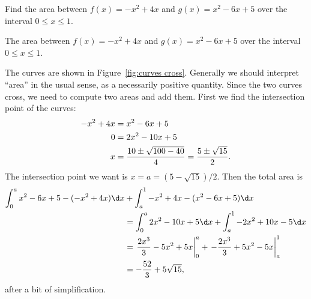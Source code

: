 \begin{example} Find the area between $f(x)= -x^2+4x$ and
$g(x)=x^2-6x+5$ over the interval $0\le x\le 1$.
\end{example}

\begin{marginfigure}
\caption{The area between $f(x)= -x^2+4x$ and
$g(x)=x^2-6x+5$ over the interval $0\le x\le 1$.}
\label{fig:curves cross}
\end{marginfigure}


\begin{solution}
The curves are shown in Figure~\ref{fig:curves cross}. Generally we
should interpret ``area'' in the usual sense, as a necessarily
positive quantity. Since the two curves cross, we need to compute two
areas and add them. First we find the intersection point of the
curves:
\begin{align*}
  -x^2+4x&=x^2-6x+5 \\
  0&=2x^2-10x+5 \\
  x&={10\pm\sqrt{100-40}\over4}={5\pm\sqrt{15}\over2}.
\end{align*}
The intersection point we want is $x=a=(5-\sqrt{15})/2$. Then
the total area is 
\begin{align*}
  \int_0^a x^2-6x+5-(-x^2+4x)\d x&+\int_a^1 -x^2+4x-(x^2-6x+5)\d x \\
  &=\int_0^a 2x^2-10x+5\d x+\int_a^1 -2x^2+10x-5\d x \\
  &=\left.{2x^3\over3}-5x^2+5x\right|_0^a + 
    \left.-{2x^3\over3}+5x^2-5x\right|_a^1 \\
  &=-{52\over3}+5\sqrt{15},
\end{align*}
after a bit of simplification.
\end{solution}


